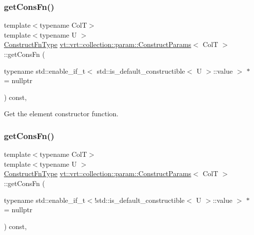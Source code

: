 \subsubsection{\texorpdfstring{get\+Cons\+Fn()}{getConsFn()}\hspace{0.1cm}{\footnotesize\ttfamily [1/2]}}
{\footnotesize\ttfamily template$<$typename ColT$>$ \\
template$<$typename U $>$ \\
\hyperlink{structvt_1_1vrt_1_1collection_1_1param_1_1_construct_params_a7ad7bdf4220701e54b485f45e08b1736}{Construct\+Fn\+Type} \hyperlink{structvt_1_1vrt_1_1collection_1_1param_1_1_construct_params}{vt\+::vrt\+::collection\+::param\+::\+Construct\+Params}$<$ ColT $>$\+::get\+Cons\+Fn (\begin{DoxyParamCaption}\item[{typename std\+::enable\+\_\+if\+\_\+t$<$ std\+::is\+\_\+default\+\_\+constructible$<$ U $>$\+::value $>$ $\ast$}]{ = {\ttfamily nullptr} }\end{DoxyParamCaption}) const\hspace{0.3cm}{\ttfamily [inline]}, {\ttfamily [private]}}



Get the element constructor function. 

\mbox{\label{structvt_1_1vrt_1_1collection_1_1param_1_1_construct_params_ab0d89974dff84686c16173b93881c0e8}} 
\subsubsection{\texorpdfstring{get\+Cons\+Fn()}{getConsFn()}\hspace{0.1cm}{\footnotesize\ttfamily [2/2]}}
{\footnotesize\ttfamily template$<$typename ColT$>$ \\
template$<$typename U $>$ \\
\hyperlink{structvt_1_1vrt_1_1collection_1_1param_1_1_construct_params_a7ad7bdf4220701e54b485f45e08b1736}{Construct\+Fn\+Type} \hyperlink{structvt_1_1vrt_1_1collection_1_1param_1_1_construct_params}{vt\+::vrt\+::collection\+::param\+::\+Construct\+Params}$<$ ColT $>$\+::get\+Cons\+Fn (\begin{DoxyParamCaption}\item[{typename std\+::enable\+\_\+if\+\_\+t$<$!std\+::is\+\_\+default\+\_\+constructible$<$ U $>$\+::value $>$ $\ast$}]{ = {\ttfamily nullptr} }\end{DoxyParamCaption}) const\hspace{0.3cm}{\ttfamily [inline]}, {\ttfamily [private]}}



